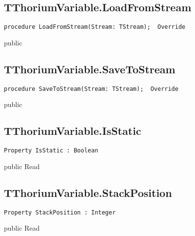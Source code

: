 \subsection{TThoriumVariable.LoadFromStream}
\label{thoriumcore:thorium:tthoriumvariable:loadfromstream}
\begin{FPCList}
\Synopsis
\Declaration 

\begin{verbatim}
procedure LoadFromStream(Stream: TStream);  Override
\end{verbatim}
\Visibility
public
\Description
\Errors
\end{FPCList}
\subsection{TThoriumVariable.SaveToStream}
\label{thoriumcore:thorium:tthoriumvariable:savetostream}
\begin{FPCList}
\Synopsis
\Declaration 

\begin{verbatim}
procedure SaveToStream(Stream: TStream);  Override
\end{verbatim}
\Visibility
public
\Description
\Errors
\end{FPCList}
\subsection{TThoriumVariable.IsStatic}
\label{thoriumcore:thorium:tthoriumvariable:isstatic}
\begin{FPCList}
\Synopsis
\Declaration 

\begin{verbatim}
Property IsStatic : Boolean
\end{verbatim}
\Visibility
public
\Access
Read
\Description
\end{FPCList}
\subsection{TThoriumVariable.StackPosition}
\label{thoriumcore:thorium:tthoriumvariable:stackposition}
\begin{FPCList}
\Synopsis
\Declaration 

\begin{verbatim}
Property StackPosition : Integer
\end{verbatim}
\Visibility
public
\Access
Read
\Description
\end{FPCList}
